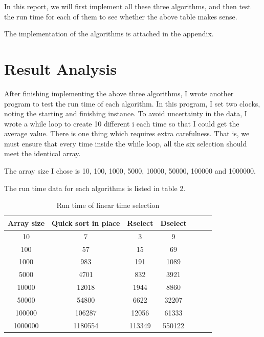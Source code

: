 \documentclass{article}
\begin{document}
\begin{spacing}{2.0}
In this report, we will first implement all these three algorithms, and then test the run time for each of them to see whether the above table makes sense.

The implementation of the algorithms is attached in the appendix.
\section{Result Analysis}
\indent After finishing implementing the above three algorithms, I wrote another program to test the run time of each algorithm. In this program, I set two clocks, noting the starting and finishing instance. To avoid uncertainty in the data, I wrote a while loop to create 10 different i each time so that I could get the average value. There is one thing which requires extra carefulness. That is, we must ensure that every time inside the while loop, all the six selection should meet the identical array.

The array size I chose is 10, 100, 1000, 5000, 10000, 50000, 100000 and 1000000.

The run time data for each algorithms is listed in table 2.
\begin{table}[!h]
\centering
\begin{tabular}{c|cccccc}
Array size&Quick sort in place&Rselect&Dselect\\
\hline
\hline
10&7&3&9\\
\hline
100&57&15&69\\
\hline
1000&983&191&1089\\
\hline
5000&4701&832&3921\\
\hline
10000&12018&1944&8860\\
\hline
50000&54800&6622&32207\\
\hline
100000&106287&12056&61333\\
\hline
1000000&1180554&113349&550122\\
\hline
\end{tabular}
\caption{Run time of linear time selection}
\end{table}


\end{spacing}
\end{document}
